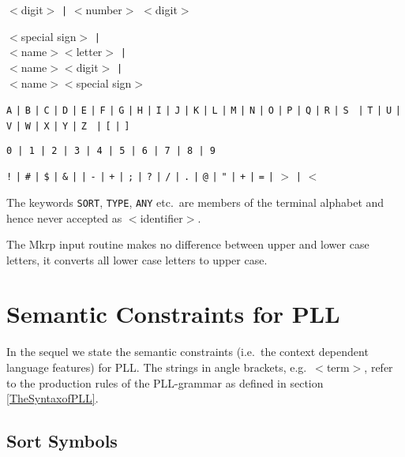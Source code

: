 %
{$<$digit$>$  {\tt |}  $<$number$>$ $<$digit$>$}

%
{$<$special sign$>$  {\tt |}\\ $<$name$>$$<$letter$>$ {\tt |} \\
$<$name$>$$<$digit$>$ {\tt |}\\ $<$na\-me$>$$<$spe\-cial sign$>$}

%
{{\tt  A} {\tt  |} {\tt  B} {\tt  |} {\tt  C} {\tt |} {\tt  D} {\tt  |} {\tt  E}
{\tt  |} {\tt  F} {\tt  |} {\tt  G}
{\tt  |} {\tt  H} {\tt   |} {\tt  I} {\tt   |} {\tt  J} {\tt   |} {\tt  K} {\tt  |}
{\tt  L} {\tt  |} {\tt  M} {\tt  |} {\tt  N} {\tt  |} {\tt O} {\tt  |}
{\tt P} {\tt |} {\tt  Q} {\tt  |} {\tt  R} {\tt  |} {\tt  S} {\tt  
|} {\tt  T} {\tt  |} {\tt  U} {\tt  |} {\tt  V} {\tt  |} {\tt  W} {\tt  |} {\tt X} {\tt  |} {\tt  Y} {\tt  |} {\tt  Z }  {\tt  |} {\tt  [} {\tt  |} {\tt  ]}}

%  
{{\tt 0 | 1 | 2 |  3 | 4 | 5 | 6 | 7 | 8 | 9 }}

%
{{\tt !} {\tt  |} {\tt \#} {\tt  |} {\tt  \$} {\tt  |} {\tt  \&} {\tt  |}
{\tt  *} {\tt  |} {\tt  -} {\tt  |} {\tt  +} {\tt  |} {\tt  ;} {\tt  |} 
{\tt  ?} {\tt  |} {\tt  /} {\tt  |} {\tt  .} {\tt  |} {\tt  @} {\tt  |} 
{\tt  "} {\tt  |} {\tt  +} {\tt  |} {\tt  =} {\tt  |} {\tt  $>$} {\tt  |} 
{\tt  $<$}}


The keywords {\tt SORT}, {\tt TYPE}, {\tt ANY} etc.\ are members of
the terminal alphabet and hence never accepted as $<$identifier$>$.

The {\sc Mkrp} input routine makes no difference between upper and
lower case letters, it converts all lower case letters to upper case.
 

\section{Semantic Constraints for PLL} 
\label{SemanticConstraintsforPLL}

In the sequel we state the semantic constraints (i.e.\ the context
dependent language features) for PLL. The strings in angle brackets,
e.g.\ $<$term$>$, refer to the production rules of the PLL-grammar as
defined in section \ref{TheSyntaxofPLL}.

\subsection{Sort Symbols}
\label{SortSymbols} 

